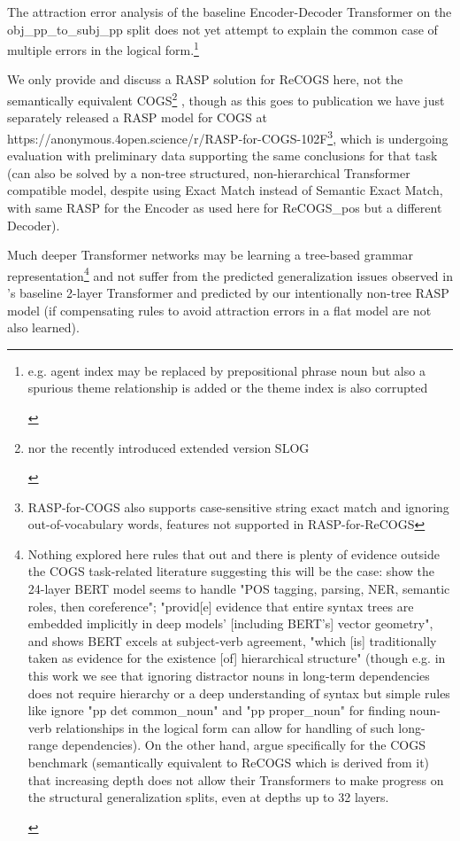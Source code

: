 \documentclass[11pt]{article}
\begin{document}
The attraction error analysis of the \cite{Wu2023} baseline Encoder-Decoder Transformer on the obj\_pp\_to\_subj\_pp split does not yet attempt to explain the common case of multiple errors in the logical form.\footnote{\begin{footnotesize}e.g. agent index may be replaced by prepositional phrase noun but also a spurious theme relationship is added or the theme index is also corrupted\end{footnotesize}}

We only provide and discuss a RASP solution for ReCOGS \cite{Wu2023} here, not the semantically equivalent COGS\footnote{\begin{footnotesize}nor the recently introduced extended version SLOG \cite{li2023slogstructuralgeneralizationbenchmark}\end{footnotesize}} \cite{KimLinzen2020}, though as this goes to publication we have just separately released a RASP model for COGS at https://anonymous.4open.science/r/RASP-for-COGS-102F\footnote{RASP-for-COGS also supports case-sensitive string exact match and ignoring out-of-vocabulary words, features not supported in RASP-for-ReCOGS}, which is undergoing evaluation with preliminary data supporting the same conclusions for that task (can also be solved by a non-tree structured, non-hierarchical Transformer compatible model, despite using Exact Match instead of Semantic Exact Match, with same RASP for the Encoder as used here for ReCOGS\_pos but a different Decoder).

Much deeper Transformer networks may be learning a tree-based grammar representation\footnote{\begin{footnotesize}Nothing explored here rules that out and there is plenty of evidence outside the COGS task-related literature suggesting this will be the case: \cite{tenney2019bertrediscoversclassicalnlp} show the 24-layer BERT model seems to handle "POS tagging, parsing, NER, semantic roles, then coreference"; \cite{hewitt-manning-2019-structural} "provid[e] evidence that entire syntax trees are embedded implicitly in deep models’ [including BERT's] vector geometry", and \cite{goldberg2019assessingbertssyntacticabilities} shows BERT excels at subject-verb agreement, "which [is] traditionally taken as evidence for
the existence [of] hierarchical structure" (though e.g. in this work we see that ignoring distractor nouns in long-term dependencies does not require hierarchy or a deep understanding of syntax but simple rules like ignore "pp det common\_noun" and "pp proper\_noun" for finding noun-verb relationships in the logical form can allow for handling of such long-range dependencies). On the other hand, \cite{petty2024impactdepthcompositionalgeneralization} argue specifically for the COGS benchmark (semantically equivalent to ReCOGS which is derived from it) that increasing depth does not allow their Transformers to make progress on the structural generalization splits, even at depths up to 32 layers.
\end{footnotesize}
} and not suffer from the predicted generalization issues observed in \cite{Wu2023}'s baseline 2-layer Transformer and predicted by our intentionally non-tree RASP model (if compensating rules to avoid attraction errors in a flat model are not also learned).
\end{document}
